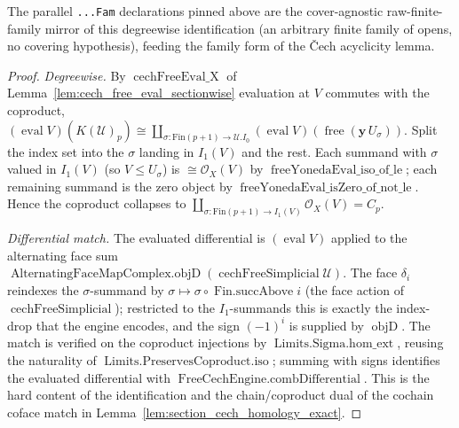 \begin{lemma}
  The parallel \texttt{...Fam} declarations pinned above are the cover-agnostic
  raw-finite-family mirror of this degreewise identification (an arbitrary finite
  family of opens, no covering hypothesis), feeding the family form of the {\v C}ech
  acyclicity lemma.
\end{lemma}

\begin{proof}
  \emph{Degreewise.} By \(\operatorname{cechFreeEval\_X}\) of
  Lemma~\ref{lem:cech_free_eval_sectionwise} evaluation at \(V\) commutes with the
  coproduct,
  \((\operatorname{eval} V)(K(\mathcal{U})_p) \cong \coprod_{\sigma :
  \mathrm{Fin}(p+1) \to \mathcal{U}.I_0} (\operatorname{eval} V)(\operatorname{free}
  (\mathbf{y}\,U_\sigma))\). Split the index set into the \(\sigma\) landing in
  \(I_1(V)\) and the rest. Each summand with \(\sigma\) valued in \(I_1(V)\) (so
  \(V \leq U_\sigma\)) is \(\cong \mathcal{O}_X(V)\) by
  \(\operatorname{freeYonedaEval\_iso\_of\_le}\); each remaining summand is the zero
  object by \(\operatorname{freeYonedaEval\_isZero\_of\_not\_le}\). Hence the coproduct
  collapses to \(\coprod_{\sigma : \mathrm{Fin}(p+1) \to I_1(V)} \mathcal{O}_X(V) =
  C_p\).

  \emph{Differential match.} The evaluated differential is \((\operatorname{eval} V)\)
  applied to the alternating face sum
  \(\operatorname{AlternatingFaceMapComplex.objD}(\operatorname{cechFreeSimplicial}
  \mathcal{U})\). The face \(\delta_i\) reindexes the \(\sigma\)-summand by
  \(\sigma \mapsto \sigma \circ \operatorname{Fin.succAbove} i\) (the face action of
  \(\operatorname{cechFreeSimplicial}\)); restricted to the
  \(I_1\)-summands this is exactly the index-drop that the engine encodes, and the sign
  \((-1)^i\) is supplied by \(\operatorname{objD}\). The match is verified on the
  coproduct injections by \(\operatorname{Limits.Sigma.hom\_ext}\), reusing the
  naturality of \(\operatorname{Limits.PreservesCoproduct.iso}\); summing with signs
  identifies the evaluated differential with
  \(\operatorname{FreeCechEngine.combDifferential}\). This is the hard content of the
  identification and the chain/coproduct dual of the cochain coface match in
  Lemma~\ref{lem:section_cech_homology_exact}.


\end{proof}
